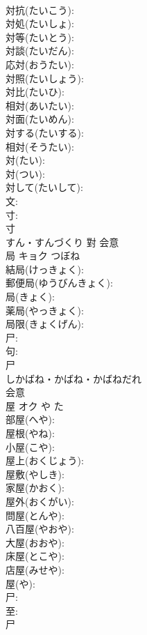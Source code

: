 \documentclass[8pt]{extreport}
\begin{document}
\begin{CJK}{UTF8}{min}
\\	対抗(たいこう): 
\\	対処(たいしょ): 
\\	対等(たいとう): 
\\	対談(たいだん): 
\\	応対(おうたい): 
\\	対照(たいしょう): 
\\	対比(たいひ): 
\\	相対(あいたい): 
\\	対面(たいめん): 
\\	対する(たいする): 
\\	相対(そうたい): 
\\	対(たい): 
\\	対(つい): 
\\	対して(たいして): 
\\	文: 
\\	寸: 
\\	寸	
\\	すん・すんづくり	對	会意 
\\	局	キョク	つぼね		
\\	結局(けっきょく): 
\\	郵便局(ゆうびんきょく): 
\\	局(きょく): 
\\	薬局(やっきょく): 
\\	局限(きょくげん): 
\\	尸: 
\\	句: 
\\	尸	
\\	しかばね・かばね・かばねだれ	
\\	会意 
\\	屋	オク	や	た	
\\	部屋(へや): 
\\	屋根(やね): 
\\	小屋(こや): 
\\	屋上(おくじょう): 
\\	屋敷(やしき): 
\\	家屋(かおく): 
\\	屋外(おくがい): 
\\	問屋(とんや): 
\\	八百屋(やおや): 
\\	大屋(おおや): 
\\	床屋(とこや): 
\\	店屋(みせや): 
\\	屋(や): 
\\	尸: 
\\	至: 
\\	尸	

\end{CJK}
\end{document}
